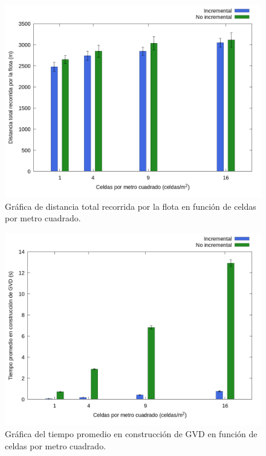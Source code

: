 \begin{figure}[H]
  \centerfloat

  \includegraphics[clip=true, width=\graphlen]{imagenes/graficas_chicas/graficas_histo_num/incrementalidad/exploration_cost.png}

  \caption{Gráfica de distancia total recorrida por la flota  en función de celdas por metro cuadrado.}\label{fig:gra:inc:ec}

\end{figure}

\begin{figure}[H]
  \centerfloat

  \includegraphics[clip=true, width=\graphlen]{imagenes/graficas_chicas/graficas_histo_num/incrementalidad/gvd_construction_time_mean.png}

  \caption{Gráfica del tiempo promedio en construcción de GVD en función de celdas por metro cuadrado.}\label{fig:gra:inc:gvdt}

\end{figure}


